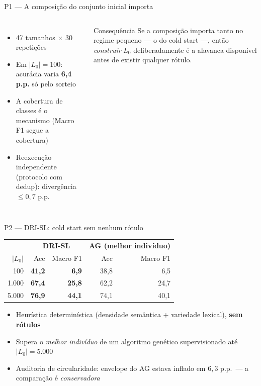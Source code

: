 \documentclass[aspectratio=169,11pt]{beamer}
\begin{document}
\begin{frame}{P1 --- A composição do conjunto inicial importa}
\begin{columns}[T]
\begin{itemize}\footnotesize
  \item 47 tamanhos $\times$ 30 repetições
  \item Em $|L_0|=100$: acurácia varia \textbf{6,4 p.p.} só pelo sorteio
  \item A cobertura de classes é o mecanismo (Macro F1 segue a cobertura)
  \item Reexecução independente (protocolo com dedup): divergência $\le 0{,}7$ p.p.
\end{itemize}
\footnotesize
\begin{block}{Consequência}
Se a composição importa tanto no regime pequeno --- o do cold start ---,
então \emph{construir} $L_0$ deliberadamente é a alavanca disponível antes
de existir qualquer rótulo.
\end{block}
\end{columns}
\end{frame}


\begin{frame}{P2 --- DRI-SL: cold start sem nenhum rótulo}
\centering\small
\begin{tabular}{r rr rr}
\toprule
& \multicolumn{2}{c}{\textbf{DRI-SL}} & \multicolumn{2}{c}{\textbf{AG (melhor indivíduo)}} \\
$|L_0|$ & Acc & Macro F1 & Acc & Macro F1 \\
\midrule
100    & \textbf{41,2} & \textbf{6,9}  & 38,8 & 6,5 \\
1.000  & \textbf{67,4} & \textbf{25,8} & 62,2 & 24,7 \\
5.000  & \textbf{76,9} & \textbf{44,1} & 74,1 & 40,1 \\
\bottomrule
\end{tabular}
\vspace{0.7em}
\begin{itemize}\footnotesize
  \item Heurística determinística (densidade semântica + variedade lexical), \textbf{sem rótulos}
  \item Supera o \emph{melhor indivíduo} de um algoritmo genético supervisionado até $|L_0|=5.000$
  \item Auditoria de circularidade: envelope do AG estava inflado em $6{,}3$ p.p.\ ---
        a comparação é \emph{conservadora}
\end{itemize}
\end{frame}
\end{document}
